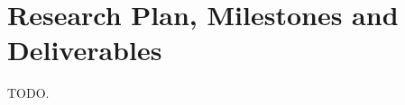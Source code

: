 \documentclass[a4paper,11pt]{article}
\begin{document}



\section{Research Plan, Milestones and Deliverables} \label{milestones}

\par TODO.

    

\end{document}
